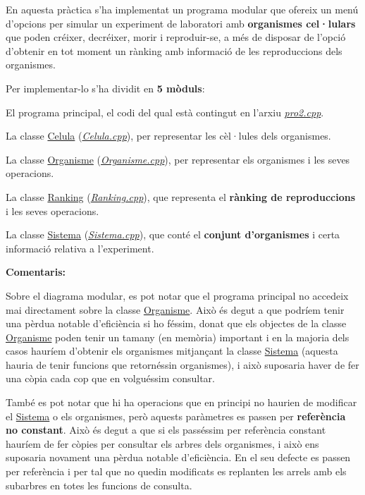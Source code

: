 En aquesta pràctica s'ha implementat un programa modular que ofereix un menú d'opcions per simular un experiment de laboratori amb {\bfseries organismes cel·lulars} que poden créixer, decréixer, morir i reproduir-\/se, a més de disposar de l'opció d'obtenir en tot moment un rànking amb informació de les reproduccions dels organismes.

Per implementar-\/lo s'ha dividit en {\bfseries 5 mòduls}\-: 
\begin{DoxyItemize}
\item El programa principal, el codi del qual està contingut en l'arxiu {\itshape \hyperlink{pro2_8cpp}{pro2.\-cpp}}. 
\item La classe \hyperlink{class_celula}{Celula} ({\itshape \hyperlink{_celula_8cpp}{Celula.\-cpp}}), per representar les cèl·lules dels organismes. 
\item La classe \hyperlink{class_organisme}{Organisme} ({\itshape \hyperlink{_organisme_8cpp}{Organisme.\-cpp}}), per representar els organismes i les seves operacions. 
\item La classe \hyperlink{class_ranking}{Ranking} ({\itshape \hyperlink{_ranking_8cpp}{Ranking.\-cpp}}), que representa el {\bfseries rànking de reproduccions} i les seves operacions. 
\item La classe \hyperlink{class_sistema}{Sistema} ({\itshape \hyperlink{_sistema_8cpp}{Sistema.\-cpp}}), que conté el {\bfseries conjunt d'organismes} i certa informació relativa a l'experiment. 
\end{DoxyItemize}

{\bfseries Comentaris\-:} 
\begin{DoxyItemize}
\item Sobre el diagrama modular, es pot notar que el programa principal no accedeix mai directament sobre la classe \hyperlink{class_organisme}{Organisme}. Això és degut a que podríem tenir una pèrdua notable d'eficiència si ho féssim, donat que els objectes de la classe \hyperlink{class_organisme}{Organisme} poden tenir un tamany (en memòria) important i en la majoria dels casos hauríem d'obtenir els organismes mitjançant la classe \hyperlink{class_sistema}{Sistema} (aquesta hauria de tenir funcions que retornéssin organismes), i això suposaria haver de fer una còpia cada cop que en volguéssim consultar.  
\item També es pot notar que hi ha operacions que en principi no haurien de modificar el \hyperlink{class_sistema}{Sistema} o els organismes, però aquests paràmetres es passen per {\bfseries referència no constant}. Això és degut a que si els passéssim per referència constant hauríem de fer còpies per consultar els arbres dels organismes, i això ens suposaria novament una pèrdua notable d'eficiència. En el seu defecte es passen per referència i per tal que no quedin modificats es replanten les arrels amb els subarbres en totes les funcions de consulta.  
\end{DoxyItemize}